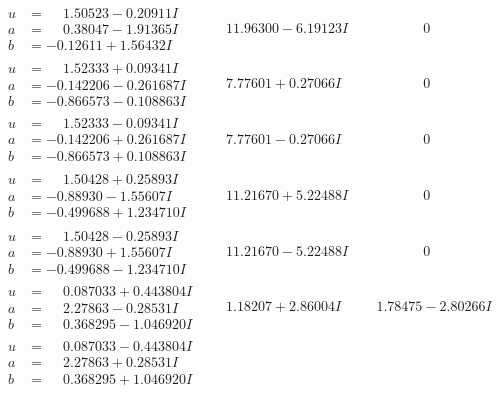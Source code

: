 \documentclass[1p]{elsarticle_modified}
\theoremstyle{definition}
\begin{document}
$$\begin{array}{c|c|c}
\begin{aligned}
u &= \phantom{-}1.50523 - 0.20911 I \\
a &= \phantom{-}0.38047 - 1.91365 I \\
b &= -0.12611 + 1.56432 I\end{aligned}
 & \phantom{-}11.96300 - 6.19123 I & \phantom{-0.000000 } 0 \\ \hline\begin{aligned}
u &= \phantom{-}1.52333 + 0.09341 I \\
a &= -0.142206 - 0.261687 I \\
b &= -0.866573 - 0.108863 I\end{aligned}
 & \phantom{-}7.77601 + 0.27066 I & \phantom{-0.000000 } 0 \\ \hline\begin{aligned}
u &= \phantom{-}1.52333 - 0.09341 I \\
a &= -0.142206 + 0.261687 I \\
b &= -0.866573 + 0.108863 I\end{aligned}
 & \phantom{-}7.77601 - 0.27066 I & \phantom{-0.000000 } 0 \\ \hline\begin{aligned}
u &= \phantom{-}1.50428 + 0.25893 I \\
a &= -0.88930 - 1.55607 I \\
b &= -0.499688 + 1.234710 I\end{aligned}
 & \phantom{-}11.21670 + 5.22488 I & \phantom{-0.000000 } 0 \\ \hline\begin{aligned}
u &= \phantom{-}1.50428 - 0.25893 I \\
a &= -0.88930 + 1.55607 I \\
b &= -0.499688 - 1.234710 I\end{aligned}
 & \phantom{-}11.21670 - 5.22488 I & \phantom{-0.000000 } 0 \\ \hline\begin{aligned}
u &= \phantom{-}0.087033 + 0.443804 I \\
a &= \phantom{-}2.27863 - 0.28531 I \\
b &= \phantom{-}0.368295 - 1.046920 I\end{aligned}
 & \phantom{-}1.18207 + 2.86004 I & \phantom{-}1.78475 - 2.80266 I \\ \hline\begin{aligned}
u &= \phantom{-}0.087033 - 0.443804 I \\
a &= \phantom{-}2.27863 + 0.28531 I \\
b &= \phantom{-}0.368295 + 1.046920 I\end{aligned}

\end{array}$$
\end{document}
